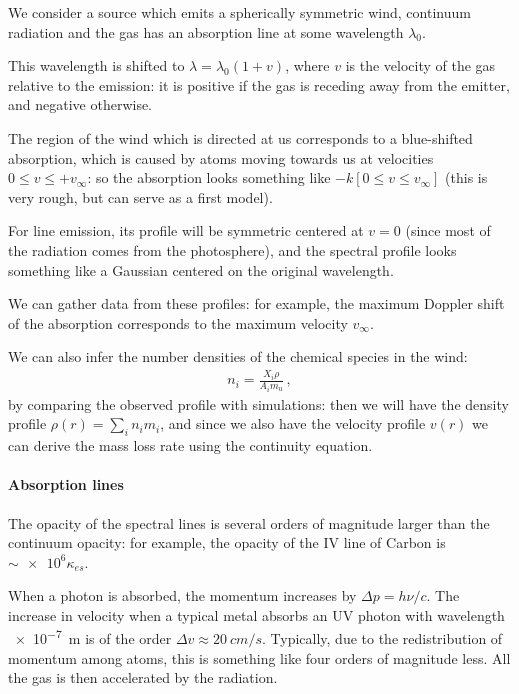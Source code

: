 \documentclass[main.tex]{subfiles}
\begin{document}
We consider a source which emits a spherically symmetric wind, continuum radiation and the gas has an absorption line at some wavelength \(\lambda_0 \). 

This wavelength is shifted to \(\lambda = \lambda_0 (1 + v)\), where \(v\) is the velocity of the gas relative to the emission: it is positive if the gas is receding away from the emitter, and negative otherwise.

The region of the wind which is directed at us corresponds to a blue-shifted absorption, which is caused by atoms moving towards us at velocities \(0 \leq v \leq + v_\infty\): so the absorption looks something like \(- k [0 \leq v \leq v_\infty]\) (this is very rough, but can serve as a first model).

For line emission, its profile will be symmetric centered at \(v=0\) (since most of the radiation comes from the photosphere), and the spectral profile looks something like a Gaussian centered on the original wavelength.

We can gather data from these profiles: for example, the maximum Doppler shift of the absorption corresponds to the maximum velocity \(v_{ \infty }\).

We can also infer the number densities of the chemical species in the wind: 
%
\begin{align}
  n_i  = \frac{X_i \rho }{A_i m_u}
\,,
\end{align}
%
by comparing the observed profile with simulations: then we will have the density profile \(\rho (r) = \sum_i n_i m_i\), and since we also have the velocity profile \(v(r)\) we can derive the mass loss rate using the continuity equation.

\paragraph{Absorption lines}

The opacity of the spectral lines is several orders of magnitude larger than the continuum opacity: for example, the opacity of the IV line of Carbon is \(\sim \num{e6} \kappa_{es}\).

When a photon is absorbed, the momentum increases by \(\Delta p = h \nu / c \). 
The increase in velocity when a typical metal absorbs an UV photon with wavelength \SI{e-7}{m} is of the order \(\Delta v \approx \SI{20}{cm/s}\). Typically, due to the redistribution of momentum among atoms, this is something like four orders of magnitude less.
All the gas is then accelerated by the radiation.
\end{document}
